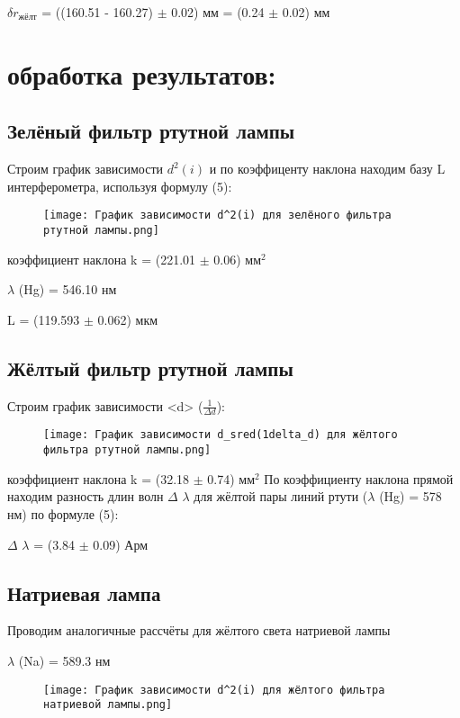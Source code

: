 \documentclass[a4paper, 12pt]{article}
\begin{document}
\par

$\delta r_{\text{жёлт}}$ = ((160.51 - 160.27) $\pm$ 0.02) мм = (0.24 $\pm$ 0.02) мм

\large\section{обработка результатов:}
\subsection{Зелёный фильтр ртутной лампы}
Строим график зависимости $d^2(i)$ и по коэффиценту наклона находим базу L интерферометра, используя формулу (5):

\begin{figure}[h]
 \centering
\texttt{[image: График зависимости d^2(i) для зелёного фильтра ртутной лампы.png]}
\end{figure}
коэффициент наклона k = (221.01 $\pm$ 0.06) $\text{мм}^2$
\par 
$\lambda$ (Hg) = 546.10 нм
\par
L = (119.593 $\pm$ 0.062) мкм
\newpage

\subsection{Жёлтый фильтр ртутной лампы}
Строим график зависимости <d> ($\frac{1}{\Delta d}$):
\par
\begin{figure}[h]
 \centering
\texttt{[image: График зависимости d\_sred(1delta\_d) для жёлтого фильтра ртутной лампы.png]}
\end{figure}
\par
коэффициент наклона k = (32.18 $\pm$ 0.74) $\text{мм}^2$ 
По коэффициенту наклона прямой находим разность длин волн $\Delta$ $\lambda$ для жёлтой пары линий ртути ($\lambda$ (Hg) = 578 нм) по формуле (5):
\par
$\Delta$ $\lambda$ = (3.84 $\pm$ 0.09) Арм


\subsection{Натриевая лампа}
Проводим аналогичные рассчёты для жёлтого света натриевой лампы
\par
$\lambda$ (Na) = 589.3 нм

\begin{figure}[h]
 \centering
\texttt{[image: График зависимости d^2(i) для жёлтого фильтра натриевой лампы.png]}
\end{figure}
\par
\end{document}
